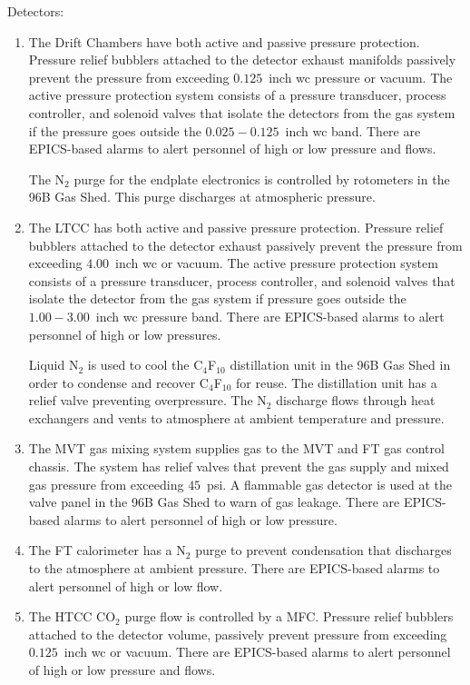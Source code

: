 \noindent
Detectors:
\begin{enumerate}
\item The Drift Chambers have both active and passive pressure protection. Pressure relief 
bubblers attached to the detector exhaust manifolds passively prevent the pressure from 
exceeding $0.125$~inch wc pressure or vacuum. The active pressure protection system consists 
of a pressure transducer, process controller, and solenoid valves that isolate the detectors 
from the gas system if the pressure goes outside the $0.025-0.125$~inch wc band. There are 
EPICS-based alarms to alert personnel of high or low pressure and flows.

The N$_2$ purge for the endplate electronics is controlled by rotometers in the 96B Gas Shed. 
This purge discharges at atmospheric pressure.

\item The LTCC has both active and passive pressure protection. Pressure relief bubblers 
attached to the detector exhaust passively prevent the pressure from exceeding $4.00$~inch wc 
or vacuum. The active pressure protection system consists of a pressure transducer, process 
controller, and solenoid valves that isolate the detector from the gas system if pressure goes 
outside the $1.00 - 3.00$~inch wc pressure band. There are EPICS-based alarms to alert 
personnel of high or low pressures.
	
Liquid N$_2$ is used to cool the C$_4$F$_{10}$ distillation unit in the 96B Gas Shed in order 
to condense and recover C$_4$F$_{10}$ for reuse. The distillation unit has a relief valve 
preventing overpressure. The N$_2$ discharge flows through heat exchangers and vents to 
atmosphere at ambient temperature and pressure.

\item The MVT gas mixing system supplies gas to the MVT and FT gas control chassis. The system 
has relief valves that prevent the gas supply and mixed gas pressure from exceeding $45$~psi. 
A flammable gas detector is used at the valve panel in the 96B Gas Shed to warn of gas leakage. 
There are EPICS-based alarms to alert personnel of high or low pressure.

\item The FT calorimeter has a N$_2$ purge to prevent condensation that discharges to the 
atmosphere at ambient pressure. There are EPICS-based alarms to alert personnel of high or low 
flow.

\item The HTCC CO$_2$ purge flow is controlled by a MFC. Pressure relief bubblers attached to 
the detector volume, passively prevent pressure from exceeding $0.125$~inch wc or vacuum. There 
are EPICS-based alarms to alert personnel of high or low pressure and flows.


\end{enumerate}
